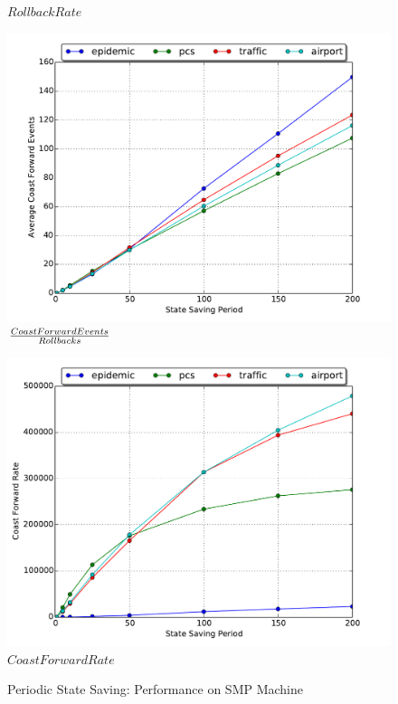\documentclass[11pt]{book}
\begin{document}
\begin{figure}
\begin{minipage}{.5\textwidth}
\begin{center}
      $Rollback Rate$ \\
    \end{center}
  \end{minipage}
  \begin{minipage}{.5\textwidth}
    \begin{center}
    \includegraphics[width=\textwidth,keepaspectratio,quiet]{figs/state_saving/bc/average_cf.pdf} \\
    ${Coast Forward Events \over Rollbacks}$
    \end{center}
  \end{minipage}%
  \hfill
  \begin{minipage}{.5\textwidth}
    \begin{center}
    \includegraphics[width=\textwidth,keepaspectratio,quiet]{figs/state_saving/bc/cf_rate.pdf} \\
    $Coast Forward Rate$
    \end{center}
  \end{minipage}
  \caption{Periodic State Saving: Performance on SMP Machine}\label{ssp_analysis_smp_performance}
\end{figure}
\end{document}
